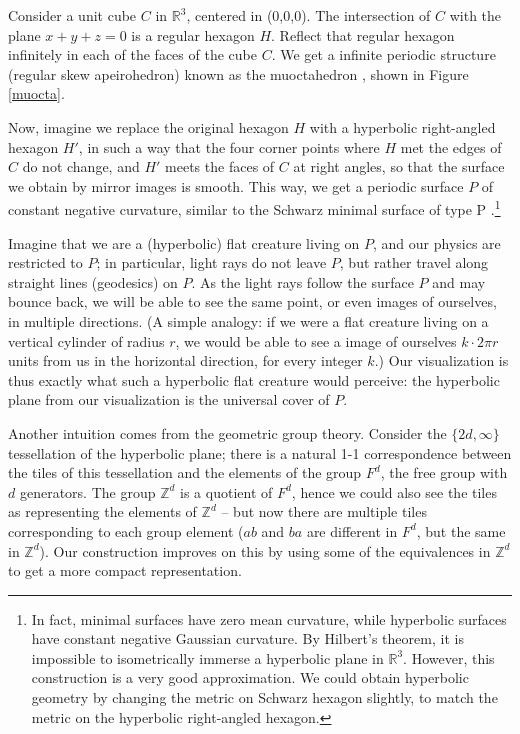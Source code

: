 \documentclass{article}
\begin{document}
Consider a unit cube $C$ in $\mathbb{R}^3$, centered in (0,0,0). The intersection of $C$ with the
plane $x+y+z=0$ is a regular hexagon $H$. Reflect that regular hexagon infinitely in each of the faces of the cube $C$. 
We get a infinite periodic structure (regular skew apeirohedron) known as the muoctahedron \cite{coxeter}, shown in
Figure \ref{muocta}.

Now, imagine we replace the original hexagon $H$ with a hyperbolic right-angled hexagon $H'$, in such a way that the four corner points
where $H$ met the edges of $C$ do not change, and $H'$ meets the faces of $C$ at right angles, so that the surface we obtain 
by mirror images is smooth. This way, we get a periodic surface $P$ of constant negative curvature, similar to the Schwarz minimal surface of type
P \cite{schwarz1890,schoen1970}.\footnote{In fact, minimal surfaces have zero mean curvature, while hyperbolic surfaces have constant negative Gaussian curvature.
By Hilbert's theorem, it is impossible to isometrically immerse a hyperbolic plane in $\mathbb{R}^3$. However, this construction is a very good
approximation. We could obtain hyperbolic geometry by changing the metric on Schwarz hexagon slightly, to match the metric on the
hyperbolic right-angled hexagon.}

Imagine that we are a (hyperbolic) flat creature living on $P$, and our physics are restricted to $P$; in particular, light rays do not leave $P$, but
rather travel along straight lines (geodesics) on $P$. As the light rays follow the surface $P$ and may bounce back, we will be able to see the same point,
or even images of ourselves, in multiple directions. (A simple analogy: if we were a flat creature living on a vertical cylinder of radius $r$, we would be able to
see a image of ourselves $k \cdot 2\pi r$ units from us in the horizontal direction, for every integer $k$.) Our visualization is thus exactly what 
such a hyperbolic flat creature would perceive: the hyperbolic plane from our visualization is the universal cover \cite{hatcher} of $P$.

Another intuition comes from the geometric group theory. Consider the $\{2d,\infty\}$ tessellation of the hyperbolic plane; there is a 
natural 1-1 correspondence between the tiles of this tessellation and the elements of the group $F^d$, the free group with $d$ generators.
The group $\mathbb{Z}^d$ is a quotient of $F^d$, hence we could also see the tiles as representing the elements of $\mathbb{Z}^d$ -- but
now there are multiple tiles corresponding to each group element ($ab$ and $ba$ are different in $F^d$, but the same in $\mathbb{Z}^d$).
Our construction improves on this by using some of the equivalences in $\mathbb{Z}^d$ to get a more compact representation.
\end{document}
